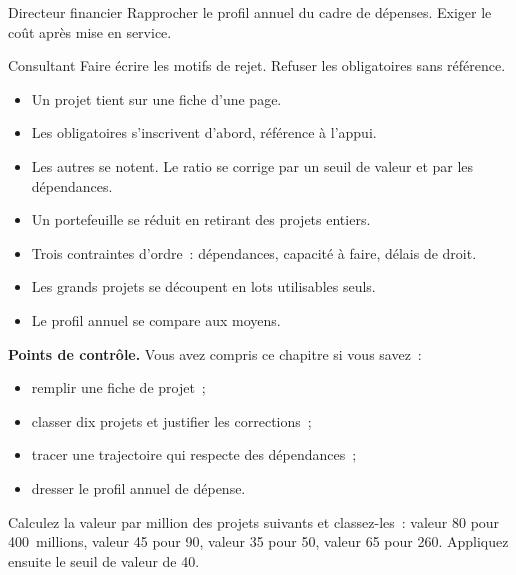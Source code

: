 \begin{boxmetier}{Directeur financier}
Rapprocher le profil annuel du cadre de dépenses. Exiger le coût après mise en service.
\end{boxmetier}

\begin{boxmetier}{Consultant}
Faire écrire les motifs de rejet. Refuser les obligatoires sans référence.
\end{boxmetier}

\begin{boxresume}
\begin{itemize}
    \item Un projet tient sur une fiche d'une page.
    \item Les obligatoires s'inscrivent d'abord, référence à l'appui.
    \item Les autres se notent. Le ratio se corrige par un seuil de valeur et par les dépendances.
    \item Un portefeuille se réduit en retirant des projets entiers.
    \item Trois contraintes d'ordre~: dépendances, capacité à faire, délais de droit.
    \item Les grands projets se découpent en lots utilisables seuls.
    \item Le profil annuel se compare aux moyens.
\end{itemize}
\end{boxresume}

\begin{boxinfo}
\textbf{Points de contrôle.} Vous avez compris ce chapitre si vous savez~:
\begin{itemize}
    \item remplir une fiche de projet~;
    \item classer dix projets et justifier les corrections~;
    \item tracer une trajectoire qui respecte des dépendances~;
    \item dresser le profil annuel de dépense.
\end{itemize}
\end{boxinfo}

\begin{boxexo}[title={\ding{45}\quad Exercice~11.1. Classer \niveaubase}]
Calculez la valeur par million des projets suivants et classez-les~: valeur 80 pour 400~millions, valeur 45 pour 90, valeur 35 pour 50, valeur 65 pour 260. Appliquez ensuite le seuil de valeur de 40.
\end{boxexo}

